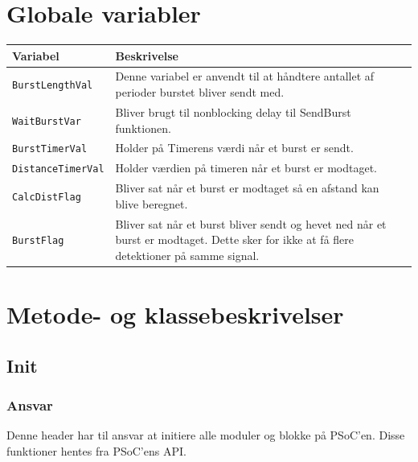 \section{Globale variabler}
\begin{table}[H]
\begin{tabular}{|l|p{10cm}|}
\hline
\cellcolor[gray]{0.8}\textbf{Variabel} &\cellcolor[gray]{0.8} \textbf{Beskrivelse}\\ \hline
\texttt{BurstLengthVal} & Denne variabel er anvendt til at håndtere antallet af perioder burstet bliver sendt med.\\ \hline
\texttt{WaitBurstVar} & Bliver brugt til nonblocking delay til SendBurst funktionen.\\ \hline
\texttt{BurstTimerVal} & Holder på Timerens værdi når et burst er sendt.\\ \hline
\texttt{DistanceTimerVal} & Holder værdien på timeren når et burst er modtaget. \\ \hline
\texttt{CalcDistFlag} & Bliver sat når et burst er modtaget så en afstand kan blive beregnet.\\ \hline
\texttt{BurstFlag} & Bliver sat når et burst bliver sendt og hevet ned når et burst er modtaget. Dette sker for ikke at få flere detektioner på samme signal.\\ \hline
\end{tabular}
\end{table}
\section{Metode- og klassebeskrivelser}

\subsection{Init}
\subsubsection{Ansvar}
Denne header har til ansvar at initiere alle moduler og blokke på PSoC'en. Disse funktioner hentes fra PSoC'ens API.

